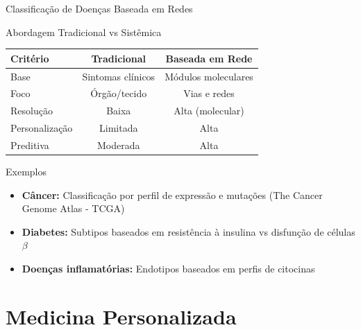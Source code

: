 \begin{frame}{Classificação de Doenças Baseada em Redes}
\begin{block}{Abordagem Tradicional vs Sistêmica}
\begin{center}
\begin{tabular}{lcc}
\toprule
\textbf{Critério} & \textbf{Tradicional} & \textbf{Baseada em Rede} \\
\midrule
Base & Sintomas clínicos & Módulos moleculares \\
Foco & Órgão/tecido & Vias e redes \\
Resolução & Baixa & Alta (molecular) \\
Personalização & Limitada & Alta \\
Preditiva & Moderada & Alta \\
\bottomrule
\end{tabular}
\end{center}
\end{block}

\vspace{0.3cm}

\begin{exampleblock}{Exemplos}
\begin{itemize}
    \item \textbf{Câncer:} Classificação por perfil de expressão e mutações (The Cancer Genome Atlas - TCGA)
    \item \textbf{Diabetes:} Subtipos baseados em resistência à insulina vs disfunção de células $\beta$
    \item \textbf{Doenças inflamatórias:} Endotipos baseados em perfis de citocinas
\end{itemize}
\end{exampleblock}

\end{frame}

\section{Medicina Personalizada}

